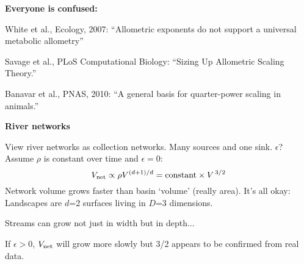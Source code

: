   \textbf{Everyone is confused:}
    
    
      White et al., Ecology, 2007:
      ``Allometric exponents do not support a universal metabolic allometry''\cite{white2007a}
    
      Savage et al., PLoS Computational Biology:
      ``Sizing Up Allometric Scaling Theory.''\cite{savage2008a}
     
      Banavar et al., PNAS, 2010:
      ``A general basis for quarter-power scaling in animals.''\cite{banavar2010a}
  
  




  \textbf{River networks}

  
   View river networks as collection networks.
   Many sources and one sink.
   $\epsilon$?
   Assume $\rho$ is constant over time and $\epsilon=0$:
    $$V_{\textnormal{net}} \propto \rho V^{(d+1)/d} = \mbox{constant} \times V^{\, 3/2} $$
   Network volume grows faster than
    basin `volume' (really area).
   \alert{It's all okay:}\\ 
    Landscapes are $d$=2 surfaces living in $D$=3 dimensions.
  
    Streams can grow not just in width but in depth...
  
    If $\epsilon > 0$, $V_{\textnormal{net}}$ will grow more slowly
    but 3/2 appears to be confirmed from real data.
  



